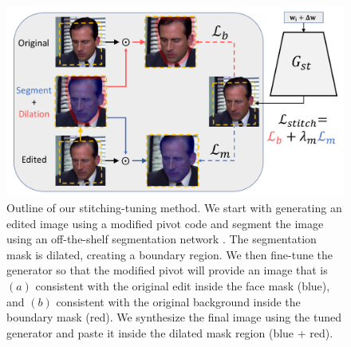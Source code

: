 \vspace{-0.1cm}
\begin{figure}[tb]
    \centering
    \setlength{\belowcaptionskip}{-5pt}
    \includegraphics[width=0.99\linewidth]{resources/images/stitching.pdf}
    \caption{
    Outline of our stitching-tuning method. We start with generating an edited image using a modified pivot code and segment the image using an off-the-shelf segmentation network \cite{yu2021bisenet}. The segmentation mask is dilated, creating a boundary region. We then fine-tune the generator so that the modified pivot will provide an image that is $(a)$ consistent with the original edit inside the face mask (blue), and $(b)$ consistent with the original background inside the boundary mask (red). We synthesize the final image using the tuned generator and paste it inside the dilated mask region (blue + red).
    }
    \label{fig:stitching}
\end{figure}